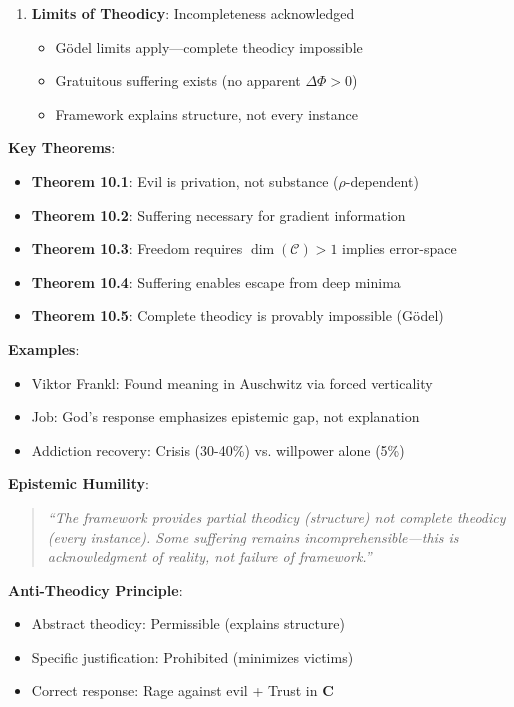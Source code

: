 \documentclass[11pt,a4paper]{article}
\theoremstyle{definition}
\theoremstyle{remark}
\newcommand{\CC}{\mathcal{C}}
\begin{document}
\begin{enumerate}
\begin{mdframed}[backgroundcolor=green!10,linewidth=2pt,linecolor=green!70!black]
\begin{enumerate}[nosep]
\begin{itemize}[nosep]
            \item Success rate: 30-40\% (crisis-catalyzed) vs. 5\% (willpower alone)
        \end{itemize}
    \item \textbf{Limits of Theodicy}: Incompleteness acknowledged
        \begin{itemize}[nosep]
            \item Gödel limits apply—complete theodicy impossible
            \item Gratuitous suffering exists (no apparent \(\Delta \Phi > 0\))
            \item Framework explains structure, not every instance
        \end{itemize}
\end{enumerate}

\textbf{Key Theorems}:
\begin{itemize}[nosep]
    \item \textbf{Theorem 10.1}: Evil is privation, not substance (\(\rho\)-dependent)
    \item \textbf{Theorem 10.2}: Suffering necessary for gradient information
    \item \textbf{Theorem 10.3}: Freedom requires \(\dim(\CC) > 1\) implies error-space
    \item \textbf{Theorem 10.4}: Suffering enables escape from deep minima
    \item \textbf{Theorem 10.5}: Complete theodicy is provably impossible (Gödel)
\end{itemize}

\textbf{Examples}:
\begin{itemize}[nosep]
    \item Viktor Frankl: Found meaning in Auschwitz via forced verticality
    \item Job: God's response emphasizes epistemic gap, not explanation
    \item Addiction recovery: Crisis (30-40\%) vs. willpower alone (5\%)
\end{itemize}

\textbf{Epistemic Humility}:
\begin{quote}
\textit{``The framework provides partial theodicy (structure) not complete theodicy (every instance). Some suffering remains incomprehensible—this is acknowledgment of reality, not failure of framework.''}
\end{quote}

\textbf{Anti-Theodicy Principle}:
\begin{itemize}[nosep]
    \item Abstract theodicy: Permissible (explains structure)
    \item Specific justification: Prohibited (minimizes victims)
    \item Correct response: Rage against evil + Trust in \(\mathbf{C}\)
\end{itemize}


\end{mdframed}
\end{enumerate}
\end{document}
